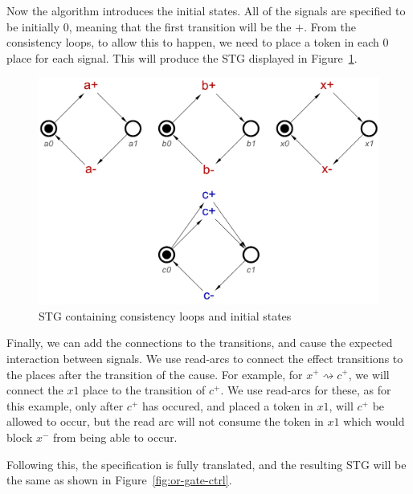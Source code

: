 \documentclass[british,conference,compsoc]{IEEEtran}
\begin{document}
Now the algorithm introduces the initial states. All of the signals are 
specified to be initially 0, meaning that the first transition will be the $+$.
From the consistency loops, to allow this to happen, we need to place a token 
in each $0$ place for each signal. This will produce the STG displayed in 
Figure~\ref{fig:tokens}.

\begin{figure}[h]
\begin{centering}
\includegraphics[scale=0.25]{Images/or-gate-ctrl-inits-stg}
\par\end{centering}
\protect\caption{\label{fig:tokens} STG containing consistency loops and 
			initial states}
\end{figure}

Finally, we can add the connections to the transitions, and cause the 
expected interaction between signals. We use read-arcs to connect the effect
transitions to the places after the transition of the cause. For example, for
$x^{+} \rightsquigarrow c^{+}$, we will connect the $x1$ place to the 
transition of $c^{+}$. We use read-arcs for these, as for this example, only
after $c^{+}$ has occured, and placed a token in $x1$, will $c^{+}$ be allowed
to occur, but the read arc will not consume the token in $x1$ which would block
$x^{-}$ from being able to occur. 

Following this, the specification is fully translated, and the resulting STG 
will be the same as shown in Figure~\ref{fig:or-gate-ctrl}.

\end{document}
